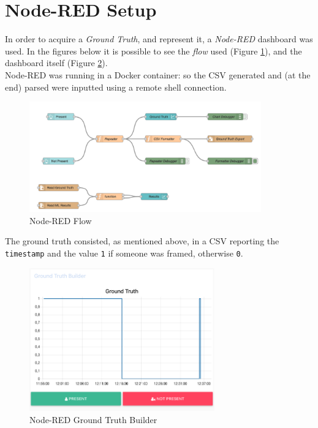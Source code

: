 \documentclass{article}
\begin{document}

\section{Node-RED Setup}

In order to acquire a \textit{Ground Truth}, and represent it, a \textit{Node-RED} dashboard was used. In the figures below it is possible to see the \textit{flow} used (Figure \ref{fig::node-red-flow}), and the dashboard itself (Figure \ref{fig::node-red-dashboard}). \\ Node-RED was running in a Docker container: so the CSV generated and (at the end) parsed were inputted using a remote shell connection.

\begin{figure}[h!]
	\centering
	\includegraphics[width=10cm]{assets/node-red-flow.png}
	\caption{Node-RED Flow}
	\label{fig::node-red-flow}
\end{figure}
The ground truth consisted, as mentioned above, in a CSV reporting the \texttt{timestamp} and the value \texttt{1} if someone was framed, otherwise \texttt{0}.

\begin{figure}[h!]
	\centering
	\includegraphics[width=8cm]{assets/ground-truth-builder.png}
	\caption{Node-RED Ground Truth Builder}
	\label{fig::node-red-dashboard}
\end{figure}
\end{document}

